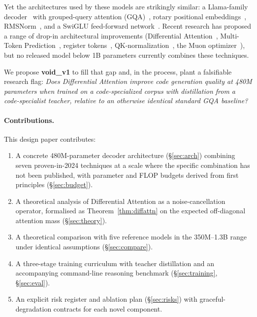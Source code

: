 \documentclass[11pt,a4paper]{article}
\theoremstyle{definition}
\theoremstyle{remark}
\begin{document}
Yet the architectures used by these models are strikingly similar: a
Llama-family decoder~\citep{touvron2023llama} with grouped-query attention
(GQA)~\citep{ainslie2023gqa}, rotary positional
embeddings~\citep{su2024roformer}, RMSNorm~\citep{zhang2019rmsnorm}, and a
SwiGLU feed-forward network~\citep{shazeer2020swiglu}. Recent research has
proposed a range of drop-in architectural improvements
(Differential Attention~\citep{ye2024differential},
Multi-Token Prediction~\citep{gloeckle2024mtp,deepseek2024v3},
register tokens~\citep{darcet2024registers},
QK-normalization~\citep{chameleon2024,dehghani2023vit22b}, the
Muon optimizer~\citep{jordan2024muon}), but no released model below 1B
parameters currently combines these techniques.

We propose \textbf{void\_v1} to fill that gap and, in the process, plant a
falsifiable research flag: \emph{Does Differential Attention improve code
generation quality at 480M parameters when trained on a code-specialized
corpus with distillation from a code-specialist teacher, relative to an
otherwise identical standard GQA baseline?}

\paragraph{Contributions.} This design paper contributes:
\begin{enumerate}[leftmargin=1.5em,itemsep=0.2em]
    \item A concrete 480M-parameter decoder architecture (\S\ref{sec:arch})
          combining seven proven-in-2024 techniques at a scale where the
          specific combination has not been published, with parameter and
          FLOP budgets derived from first principles (\S\ref{sec:budget}).
    \item A theoretical analysis of Differential Attention as a
          noise-cancellation operator, formalised as
          Theorem~\ref{thm:diffattn} on the expected off-diagonal attention
          mass (\S\ref{sec:theory}).
    \item A theoretical comparison with five reference models in the
          350M--1.3B range under identical assumptions (\S\ref{sec:compare}).
    \item A three-stage training curriculum with teacher distillation and
          an accompanying command-line reasoning benchmark
          (\S\ref{sec:training}, \S\ref{sec:eval}).
    \item An explicit risk register and ablation plan
          (\S\ref{sec:risks}) with graceful-degradation contracts for each
          novel component.
\end{enumerate}
\end{document}
